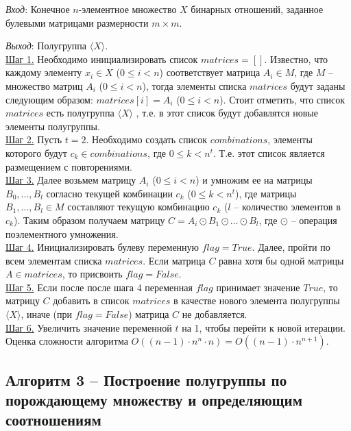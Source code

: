 \documentclass[bachelor, och, labwork]{shiza}
\begin{document}
        \textit{Вход}: Конечное $n$-элементное множество $X$ бинарных отношений, заданное булевыми матрицами размерности $m \times m$.

        \textit{Выход}: Полугруппа $\langle X \rangle$.\\
        \underline{Шаг 1.} Необходимо инициализировать список $matrices = []$. Известно, что каждому элементу $x_i \in X$ ($0 \leq i < n$)
        соответствует матрица $A_i \in M$, где $M$ -- множество матриц $A_i$ ($0 \leq i < n$), тогда элементы списка $matrices$ будут
        заданы следующим образом: $matrices[i] = A_i$ ($0 \leq i < n$). Стоит отметить, что список $matrices$ есть полугруппа $\langle X \rangle$
        , т.е. в этот список будут добавлятся новые элементы полугруппы.\\
        \underline{Шаг 2.} Пусть $t = 2$. Необходимо создать список $combinations$, элементы которого будут $c_k \in combinations$, где $0 \leq k < n^t$.
        Т.е. этот список является размещением с повторениями.\\
        \underline{Шаг 3.} Далее возьмем матрицу $A_i$ ($0 \leq i < n$) и умножим ее на матрицы $B_0, ..., B_l$ согласно текущей комбинации $c_k$ 
        ($0 \leq k < n^t$), где матрицы $B_1, ..., B_l \in M$ составляют текущую комбинацию $c_k$ ($l$ -- количество элементов в $c_k$).
        Таким образом получаем матрицу $C = A_i \odot B_1 \odot \dots \odot B_l$, где $\odot$ -- операция поэлементного умножения. \\
        \underline{Шаг 4.} Инициализировать булеву переменную $flag = True$. Далее, пройти по всем элементам списка $matrices$. Если
        матрица $C$ равна хотя бы одной матрицы $A \in matrices$, то присвоить $flag = False$.\\
        \underline{Шаг 5.} Если после после шага 4 переменная $flag$ принимает значение $True$, то матрицу $C$ добавить в список $matrices$
        в качестве нового элемента полугруппы $\langle X \rangle$, иначе (при $flag = False$) матрица $C$ не добавляется. \\
        \underline{Шаг 6.} Увеличить значение переменной $t$ на 1, чтобы перейти к новой итерации. \\

        Оценка сложности алгоритма $O((n - 1) \cdot n^n \cdot n) = O((n-1) \cdot n^{n+1})$.\\

        \subsection{Алгоритм 3 -- Построение полугруппы по порождающему множеству и определяющим соотношениям}
\end{document}
